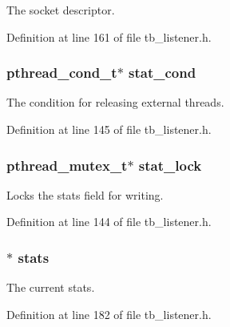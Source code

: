 The socket descriptor. 



Definition at line 161 of file tb\-\_\-listener.\-h.

\hypertarget{structtb__listener__t_a7f764a9f865a1a752a852d4d4422023a}{
\subsubsection[{stat\-\_\-cond}]{\setlength{\rightskip}{0pt plus 5cm}pthread\-\_\-cond\-\_\-t$\ast$ stat\-\_\-cond}}\label{structtb__listener__t_a7f764a9f865a1a752a852d4d4422023a}


The condition for releasing external threads. 



Definition at line 145 of file tb\-\_\-listener.\-h.

\hypertarget{structtb__listener__t_ab828bf6b1b85621025b518a892b79d79}{
\subsubsection[{stat\-\_\-lock}]{\setlength{\rightskip}{0pt plus 5cm}pthread\-\_\-mutex\-\_\-t$\ast$ stat\-\_\-lock}}\label{structtb__listener__t_ab828bf6b1b85621025b518a892b79d79}


Locks the stats field for writing. 



Definition at line 144 of file tb\-\_\-listener.\-h.

\hypertarget{structtb__listener__t_a464593aa6d4c80e0f689c501c4e81e8c}{
\subsubsection[{stats}]{$\ast$ stats}}\label{structtb__listener__t_a464593aa6d4c80e0f689c501c4e81e8c}


The current stats. 



Definition at line 182 of file tb\-\_\-listener.\-h.

